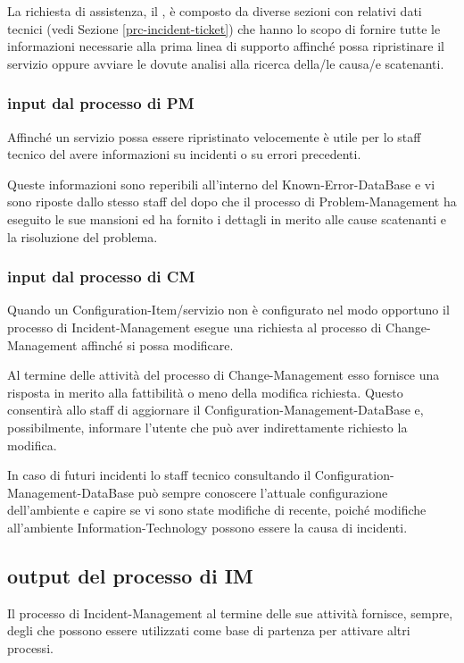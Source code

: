 La richiesta di assistenza, il , è composto da diverse sezioni con relativi dati tecnici (vedi Sezione \ref{prc-incident-ticket}) che hanno lo scopo di fornire tutte le informazioni necessarie alla prima linea di supporto affinché possa ripristinare il servizio oppure avviare le dovute analisi alla ricerca della/le causa/e scatenanti.

\subsubsection[Input dal processo di PM]{input dal processo di PM}
Affinché un servizio possa essere ripristinato velocemente è utile per lo staff tecnico del  avere informazioni su incidenti o su errori precedenti.

Queste informazioni sono reperibili all'interno del \ac{Known-Error-DataBase} e vi sono riposte dallo stesso staff del  dopo che il processo di \ac{Problem-Management} ha eseguito le sue mansioni ed ha fornito i dettagli in merito alle cause scatenanti e la risoluzione del problema.

\subsubsection[Input dal processo di CM]{input dal processo di CM}
Quando un \ac{Configuration-Item}/servizio non è configurato nel modo opportuno il processo di \ac{Incident-Management} esegue una richiesta al processo di \ac{Change-Management} affinché si possa modificare.

Al termine delle attività del processo di \ac{Change-Management} esso fornisce una risposta in merito alla fattibilità o meno della modifica richiesta. Questo consentirà allo staff di aggiornare il \ac{Configuration-Management-DataBase} e, possibilmente, informare l'utente che può aver indirettamente richiesto la modifica.

In caso di futuri incidenti lo staff tecnico consultando il \ac{Configuration-Management-DataBase} può sempre conoscere l'attuale configurazione dell'ambiente e capire se vi sono state modifiche di recente, poiché modifiche all'ambiente \acs{Information-Technology} possono essere la causa di incidenti.

\subsection[Output del processo di IM]{output del processo di IM}
\label{prc-incident-output}
Il processo di \ac{Incident-Management} al termine delle sue attività fornisce, sempre, degli  che possono essere utilizzati come base di partenza per attivare altri processi.

